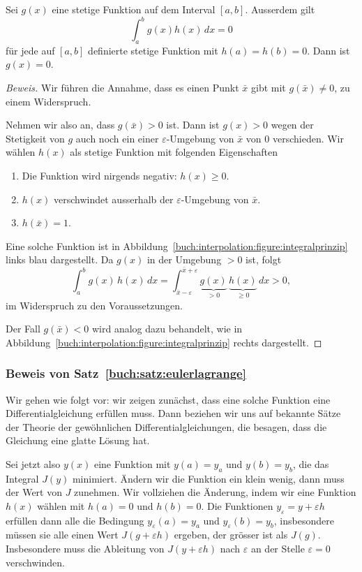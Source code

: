 \begin{lemma}[Integralprinzip]
\label{buch:lemma:integralprinzip}
Sei $g(x)$ eine stetige Funktion auf dem Interval $[a,b]$.
Ausserdem gilt
\[
\int_a^b g(x)  h(x)\,dx = 0
\]
für jede auf $[a,b]$ definierte stetige Funktion mit $h(a)=h(b)=0$.
Dann ist $g(x)=0$.
\end{lemma}

\begin{proof}[Beweis]
Wir führen die Annahme, dass es einen Punkt $\bar{x}$ gibt mit
$g(\bar{x})\ne 0$, zu einem Widerspruch.

Nehmen wir also an, dass $g(\bar{x})>0$ ist.
Dann ist $g(x)>0$ wegen der Stetigkeit von $g$ auch noch ein einer
$\varepsilon$-Umgebung von $\bar{x}$ von $0$ verschieden.
Wir wählen $h(x)$ als stetige Funktion mit folgenden Eigenschaften
\begin{enumerate}
\item
Die Funktion wird nirgends negativ: $h(x)\ge 0$.
\item
$h(x)$ verschwindet ausserhalb der $\varepsilon$-Umgebung von $\bar{x}$.
\item
$h(\bar{x})=1$.
\end{enumerate}
Eine solche Funktion ist in
Abbildung~\ref{buch:interpolation:figure:integralprinzip} links
blau dargestellt.
Da $g(x)$ in der Umgebung $>0$ ist, folgt
\[
\int_a^b g(x)\,h(x)\,dx
=
\int_{\bar{x}-\varepsilon}^{\bar{x}+\varepsilon}
\underbrace{g(x)}_{\displaystyle>0}\,\underbrace{h(x)}_{\displaystyle\ge 0}\,dx
>
0,
\]
im Widerspruch zu den Voraussetzungen.

Der Fall $g(\bar{x})<0$ wird analog dazu behandelt, wie in
Abbildung~\ref{buch:interpolation:figure:integralprinzip} rechts
dargestellt.
\end{proof}

\subsubsection{Beweis von Satz~\ref{buch:satz:eulerlagrange}}
Wir gehen wie folgt vor: wir zeigen zunächst, dass eine solche Funktion
eine Differentialgleichung erfüllen muss.
Dann beziehen wir uns auf bekannte Sätze der Theorie der gewöhnlichen
Differentialgleichungen, die besagen, dass die Gleichung eine glatte 
Lösung hat.

Sei jetzt also $y(x)$ eine Funktion mit $y(a)=y_a$ und $y(b)=y_b$, die
das Integral $J(y)$ minimiert.
Ändern wir die Funktion ein klein wenig, dann muss der Wert von $J$ zunehmen.
Wir vollziehen die Änderung, indem wir eine Funktion $h(x)$
wählen mit $h(a)=0$ und $h(b)=0$.
Die Funktionen $y_\varepsilon= y+\varepsilon h$ erfüllen dann alle die
Bedingung $y_\varepsilon(a)=y_a$ und $y_\varepsilon(b)=y_b$, insbesondere
müssen sie alle einen Wert $J(g+\varepsilon h)$ ergeben, der grösser ist
als $J(g)$.
Insbesondere muss die Ableitung von $J(y+\varepsilon h)$ nach $\varepsilon$
an der Stelle $\varepsilon=0$ verschwinden.

